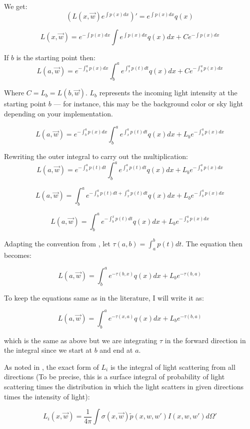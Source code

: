 We get:
\[
(L(x, \vec{w})e^{\int{p(x)dx}})' = e^{\int{p(x)dx}}q(x)
\]

\[
L(x, \vec{w}) = e^{-\int{p(x)dx}}\int{e^{\int{p(x)dx}}q(x)dx} + Ce^{-\int{p(x)dx}}
\]

If $b$ is the starting point then:
\[
L(a, \vec{w}) = e^{-\int_{b}^{a}{p(x)dx}}\int_b^{a}{e^{\int_x^{a}{p(t)dt}}q(x)dx} + Ce^{-\int_b^{a}{p(x)dx}}
\]

Where $C = L_b = L(b, \vec{w})$. $L_b$ represents the incoming light intensity at the starting point $b$ — for instance, this may be the background color or sky light depending on your implementation.

\[
L(a, \vec{w}) = e^{-\int_{b}^{a}{p(x)dx}}\int_b^{a}{e^{\int_x^{a}{p(t)dt}}q(x)dx} + L_be^{-\int_b^{a}{p(x)dx}}
\]

Rewriting the outer integral to carry out the multiplication:
\[
L(a, \vec{w}) = e^{-\int_{b}^{a}{p(t)dt}}\int_b^{a}{e^{\int_x^{a}{p(t)dt}}q(x)dx} + L_be^{-\int_b^{a}{p(x)dx}}
\]

\[
L(a, \vec{w}) = \int_b^{a}{e^{-\int_{b}^{a}{p(t)dt}+\int_x^{a}{p(t)dt}}q(x)dx} + L_be^{-\int_b^{a}{p(x)dx}}
\]

\[
L(a, \vec{w}) = \int_b^{a}{e^{-\int_{b}^{x}{p(t)dt}}q(x)dx} + L_be^{-\int_b^{a}{p(x)dx}}
\]

Adapting the convention from \cite{palenik2016volumetricclouds}, let $\tau(a, b) = \int_a^b{p(t)dt}$. The equation then becomes: 

\[
L(a, \vec{w}) = \int_b^{a}{e^{-\tau(b, x)}q(x)dx} + L_be^{-\tau(b, a)}
\]

To keep the equations same as in the literature, I will write it as:

\begin{equation}\label{eq:light}
L(a, \vec{w}) = \int_b^{a}{e^{-\tau(x, a)}q(x)dx} + L_be^{-\tau(b, a)}
\end{equation}

which is the same as above but we are integrating $\tau$ in the forward direction in the integral since we start at $b$ and end at $a$.

As noted in \cite{palenik2016volumetricclouds}, the exact form of $L_i$ is the integral of light scattering from all directions (To be precise, this is a surface integral of probability of light scattering times the distribution in which the light scatters in given directions times the intensity of light): 

\[
    L_i(x, \vec{w}) = \frac{1}{4\pi}\int\sigma(x, \vec{w})\tilde{p}(x, w, w')I(x, w, w')d\Omega'
\]

